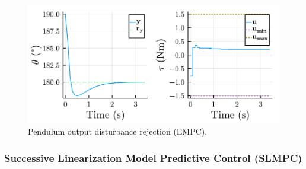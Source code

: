 \begin{figure}[ht]
    \centering
    \includegraphics[width=\columnwidth]{fig/plot_EconomMPC2.pdf}
    \caption{Pendulum output disturbance rejection (EMPC).}\label{fig:plot_EconomMPC2}
\end{figure}

\subsubsection{Successive Linearization Model Predictive Control (SLMPC)}
\label{sec:successive_linearization}

